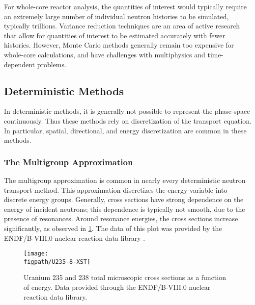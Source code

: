 {{{      For whole-core reactor analysis, the quantities of interest would typically require an extremely large number of individual neutron histories to be simulated, typically trillions.
      Variance reduction techniques are an area of active research that allow for quantities of interest to be estimated accurately with fewer histories. %
      However, Monte Carlo methods generally remain too expensive for whole-core calculations, and have challenges with multiphysics and time-dependent problems.
    }

    \subsection{Deterministic Methods}{\label{ssec:NTT:Deterministic Methods}
      In deterministic methods, it is generally not possible to represent the phase-space continuously.
      Thus these methods rely on discretization of the transport equation.
      In particular, spatial, directional, and energy discretization are common in these methods.
      
      \subsubsection{The Multigroup Approximation}{\label{sssec:NTT:The Multigroup Approximation}
        The multigroup approximation is common in nearly every deterministic neutron transport method.
        This approximation discretizes the energy variable into discrete energy groups.
        Generally, cross sections have strong dependence on the energy of incident neutrons; this dependence is typically not smooth, due to the presence of resonances.
        Around resonance energies, the cross sections increase significantly, as observed in \cref{fig:NTT:Cross Section plot}.
        The data of this plot was provided by the ENDF/B-VIII.0 nuclear reaction data library \cite{ENDF8}.

        \begin{figure}[h]
          \centering
          \texttt{[image: \\figpath/U235-8-XST]}
          \caption{Uranium 235 and 238 total microscopic cross sections as a function of energy. Data provided through the ENDF/B-VIII.0 nuclear reaction data library.}
          \label{fig:NTT:Cross Section plot}
        \end{figure}

}}}}
